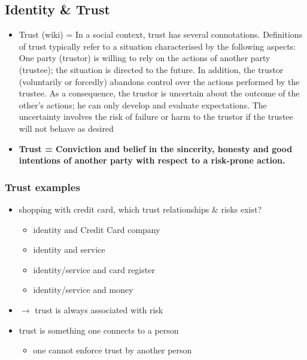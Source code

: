 \documentclass[11pt]{article}
\begin{document}
\subsection{Identity \& Trust}
\label{sec:orge9f2b39}
\begin{itemize}
\item Trust (wiki) = In a social context, trust has several connotations. Definitions of trust typically refer to a situation characterised by the following aspects: One party (trustor) is willing to rely on the actions of another party (trustee); the situation is directed to the future. In addition, the trustor (voluntarily or forcedly) abandons control over the actions performed by the trustee. As a consequence, the trustor is uncertain about the outcome of the other's actions; he can only develop and evaluate expectations. The uncertainty involves the risk of failure or harm to the trustor if the trustee will not behave as desired
\item \textbf{Trust = Conviction and belief in the sincerity, honesty and good intentions of another party with respect to a risk-prone action.}
\end{itemize}
\subsubsection{Trust examples}
\label{sec:org4425c64}
\begin{itemize}
\item shopping with credit card, which trust relationships \& risks exist?
\begin{itemize}
\item identity and Credit Card company
\item identity and service
\item identity/service and card register
\item identity/service and money
\end{itemize}
\item \(\rightarrow\) trust is always associated with risk
\item trust is something one connects to a person
\begin{itemize}
\item one cannot enforce trust by another person
\end{itemize}
\end{itemize}
\end{document}

